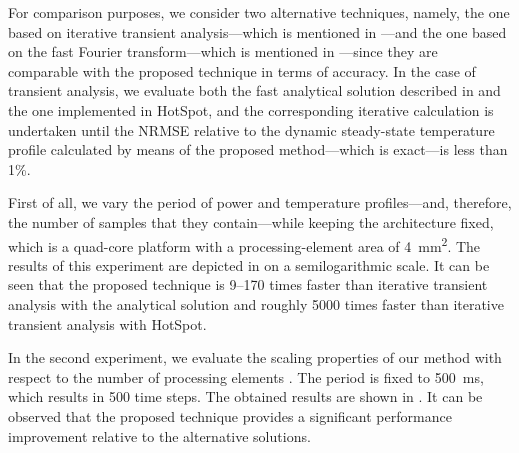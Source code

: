 For comparison purposes, we consider two alternative techniques, namely, the one
based on iterative transient analysis---which is mentioned in
---and the one based on the fast Fourier
transform---which is mentioned in ---since
they are comparable with the proposed technique in terms of accuracy. In the
case of transient analysis, we evaluate both the fast analytical solution
described in  and the one implemented in HotSpot,
and the corresponding iterative calculation is undertaken until the \ac{NRMSE}
relative to the dynamic steady-state temperature profile calculated by means of
the proposed method---which is exact---is less than 1\%.

First of all, we vary the period \period of power and temperature
profiles---and, therefore, the number of samples \ns that they contain---while
keeping the architecture fixed, which is a quad-core platform with a
processing-element area of 4~mm\textsuperscript{2}. The results of this
experiment are depicted in  on a
semilogarithmic scale. It can be seen that the proposed technique is 9--170
times faster than iterative transient analysis with the analytical solution and
roughly 5000 times faster than iterative transient analysis with HotSpot.

In the second experiment, we evaluate the scaling properties of our method with
respect to the number of processing elements \np. The period is fixed to 500~ms,
which results in 500 time steps. The obtained results are shown in
. It can be observed that the
proposed technique provides a significant performance improvement relative to
the alternative solutions.
